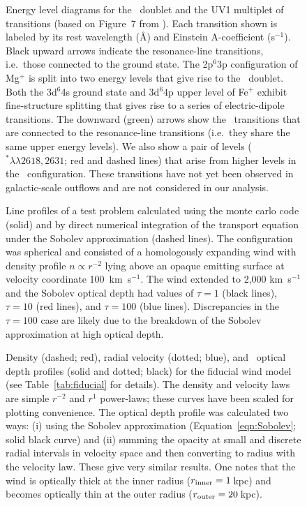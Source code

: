 \documentclass[12pt,preprint]{aastex}
\begin{document}
\begin{figure}
\caption{
Energy level diagrams for the \mgiid\ doublet and the UV1
multiplet of  transitions   
(based on Figure~7 from \cite{hmt+99}).
Each transition shown is
labeled by its rest wavelength (\AA) and Einstein A-coefficient
(s$^{-1}$). Black upward arrows
indicate the resonance-line transitions, i.e.\ those connected to the ground
state.  The 2p$^6$3p configuration of Mg$^+$ is split into
two energy levels that give rise to the \mgiid\ doublet.  
Both the 3d$^6$4s ground state and 3d$^6$4p upper level of Fe$^+$
exhibit fine-structure splitting that gives rise to a series of
electric-dipole transitions. 
The downward (green) arrows show the \feiis\ transitions that are connected to the
resonance-line transitions (i.e.\ they share the same upper energy
levels).  We also show a pair of levels ($^* \lambda\lambda
2618,2631$; red and dashed lines) that arise from higher levels in the \zconfig\
configuration.  These transitions have not yet been observed in
galactic-scale outflows and are not considered in our analysis.
}
\label{fig:energy}
\end{figure}

\begin{figure}
\caption{
Line profiles of a test problem calculated using the monte carlo code (solid) and by direct numerical integration of the transport equation under the Sobolev approximation (dashed lines).  The configuration was  spherical and consisted of a homologously expanding wind  with density profile $n \propto r^{-2}$  lying above an opaque emitting surface at velocity coordinate 100~km~s$^{-1}$.  
The wind extended to 2,000 km~s$^{-1}$ and the Sobolev optical depth had values of  $\tau = 1$ (black lines), $\tau = 10$ (red lines), and $\tau = 100$ (blue lines).    Discrepancies in the $\tau = 100$ case are likely due to the breakdown of the Sobolev approximation at high optical depth. 
}
\label{fig:oneline_test}
\end{figure}


\begin{figure}
\caption{
Density (dashed; red), radial velocity (dotted; blue), and
\mgiia\ optical depth profiles (solid and dotted; black) for the fiducial
wind model (see Table~\ref{tab:fiducial} for details).
The density and velocity laws are simple $r^{-2}$ and $r^1$
power-laws; these curves have been scaled for plotting
convenience.  
The optical depth profile was calculated two ways: (i) using the
Sobolev approximation (Equation~\ref{eqn:Sobolev}; solid black curve)
and (ii) summing
the opacity at small and discrete radial intervals in velocity space
and then converting to radius with the velocity law.  These give
very similar results. One notes that
the wind is optically thick at the inner radius ($r_{\rm inner} =
1$\,kpc) and becomes optically thin at the outer radius ($r_{\rm
  outer} = 20$\,kpc).
}
\label{fig:fiducial_nvt}
\end{figure}
\end{document}
